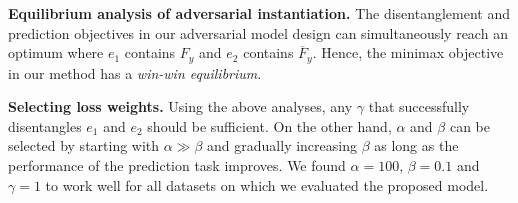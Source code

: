 \textbf{Equilibrium analysis of adversarial instantiation.\quad} The disentanglement and prediction objectives in our adversarial model design can simultaneously reach an optimum where $e_1$ contains $F_y$ and $e_2$ contains $\overline{F}_y$. Hence, the minimax objective in our method has a \emph{win-win equilibrium}.

\textbf{Selecting loss weights. \quad} Using the above analyses, any $\gamma$ that successfully disentangles $e_1$ and $e_2$ should be sufficient. On the other hand, $\alpha$ and $\beta$ can be selected by starting with $\alpha \gg \beta$ and gradually increasing $\beta$ as long as the performance of the prediction task improves. We found $\alpha = 100$, $\beta = 0.1$ and $\gamma = 1$ to work well for all datasets on which we evaluated the proposed model.